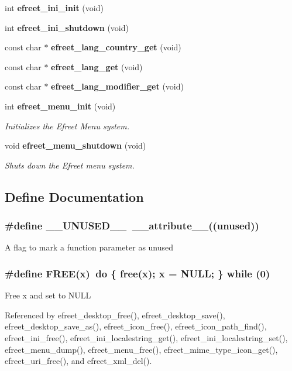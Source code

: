 \begin{CompactItemize}
int {\bf efreet\_\-ini\_\-init} (void)
\item 
int {\bf efreet\_\-ini\_\-shutdown} (void)
\item 
const char $\ast$ {\bf efreet\_\-lang\_\-country\_\-get} (void)
\item 
const char $\ast$ {\bf efreet\_\-lang\_\-get} (void)
\item 
const char $\ast$ {\bf efreet\_\-lang\_\-modifier\_\-get} (void)
\item 
int {\bf efreet\_\-menu\_\-init} (void)
\begin{CompactList}\small\item\em Initializes the Efreet Menu system. \item\end{CompactList}\item 
void {\bf efreet\_\-menu\_\-shutdown} (void)
\begin{CompactList}\small\item\em Shuts down the Efreet menu system. \item\end{CompactList}\end{CompactItemize}


\subsection{Define Documentation}
\subsubsection{\setlength{\rightskip}{0pt plus 5cm}\#define \_\-\_\-UNUSED\_\-\_\-~\_\-\_\-attribute\_\-\_\-((unused))}\label{group__Efreet__Private_g1c7b852eb40bb6d69f33c1a3c7b509eb}


A flag to mark a function parameter as unused 
\subsubsection{\setlength{\rightskip}{0pt plus 5cm}\#define FREE(x)~do \{ free(x); x = NULL; \} while (0)}\label{group__Efreet__Private_g25875003b43b81a4302256caa4a13599}


Free x and set to NULL 

Referenced by efreet\_\-desktop\_\-free(), efreet\_\-desktop\_\-save(), efreet\_\-desktop\_\-save\_\-as(), efreet\_\-icon\_\-free(), efreet\_\-icon\_\-path\_\-find(), efreet\_\-ini\_\-free(), efreet\_\-ini\_\-localestring\_\-get(), efreet\_\-ini\_\-localestring\_\-set(), efreet\_\-menu\_\-dump(), efreet\_\-menu\_\-free(), efreet\_\-mime\_\-type\_\-icon\_\-get(), efreet\_\-uri\_\-free(), and efreet\_\-xml\_\-del().
